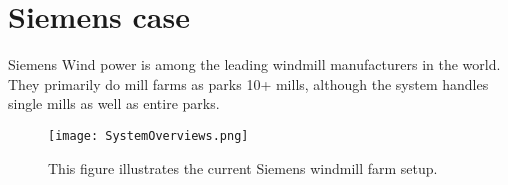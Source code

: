 \chapter{Siemens case}

Siemens Wind power is among the leading windmill manufacturers in the world. They primarily do mill farms as parks 10+ mills, although the system handles single mills as well as entire parks.


\begin{figure}
	\centering
	\texttt{[image: SystemOverviews.png]} 
	\caption[Illustrates the current Siemens windmill farm setup]{
		\label{fig:currentSiemensSetup} 
		\footnotesize{%
			This figure illustrates the current Siemens windmill farm setup.
		}
	}
\end{figure}
